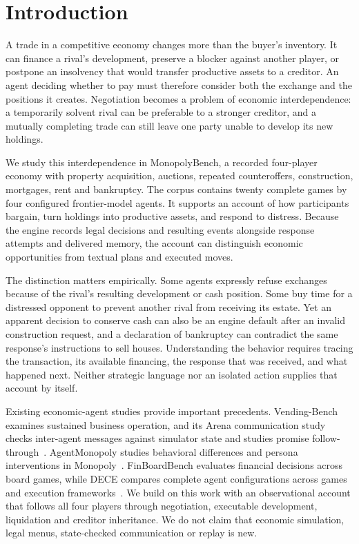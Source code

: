 \section{Introduction}

A trade in a competitive economy changes more than the buyer's inventory. It can finance a rival's development, preserve a blocker against another player, or postpone an insolvency that would transfer productive assets to a creditor. An agent deciding whether to pay must therefore consider both the exchange and the positions it creates. Negotiation becomes a problem of economic interdependence: a temporarily solvent rival can be preferable to a stronger creditor, and a mutually completing trade can still leave one party unable to develop its new holdings.

We study this interdependence in MonopolyBench, a recorded four-player economy with property acquisition, auctions, repeated counteroffers, construction, mortgages, rent and bankruptcy. The corpus contains twenty complete games by four configured frontier-model agents. It supports an account of how participants bargain, turn holdings into productive assets, and respond to distress. Because the engine records legal decisions and resulting events alongside response attempts and delivered memory, the account can distinguish economic opportunities from textual plans and executed moves.

The distinction matters empirically. Some agents expressly refuse exchanges because of the rival's resulting development or cash position. Some buy time for a distressed opponent to prevent another rival from receiving its estate. Yet an apparent decision to conserve cash can also be an engine default after an invalid construction request, and a declaration of bankruptcy can contradict the same response's instructions to sell houses. Understanding the behavior requires tracing the transaction, its available financing, the response that was received, and what happened next. Neither strategic language nor an isolated action supplies that account by itself.

Existing economic-agent studies provide important precedents. Vending-Bench examines sustained business operation, and its Arena communication study checks inter-agent messages against simulator state and studies promise follow-through~\cite{backlund2025vendingbench,li2026arena}. AgentMonopoly studies behavioral differences and persona interventions in Monopoly~\cite{wu2026agentmonopoly}. FinBoardBench evaluates financial decisions across board games, while DECE compares complete agent configurations across games and execution frameworks~\cite{hu2026finboardbench,zhang2026dece}. We build on this work with an observational account that follows all four players through negotiation, executable development, liquidation and creditor inheritance. We do not claim that economic simulation, legal menus, state-checked communication or replay is new.


